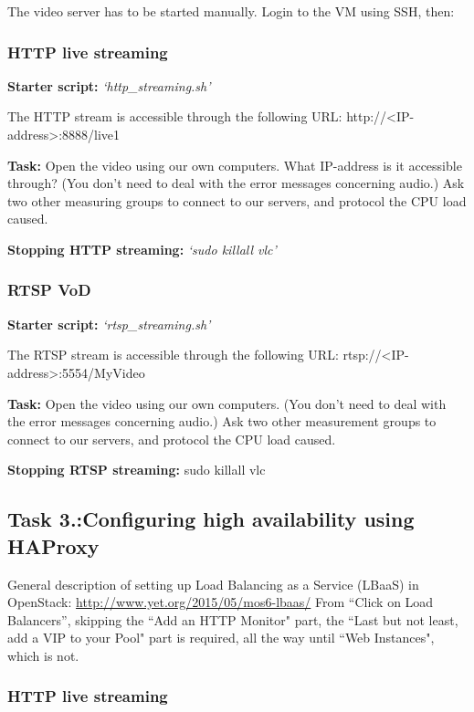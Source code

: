 \documentclass[a4paper]{article}
\begin{document}
The video server has to be started manually. Login to the VM using SSH, then:

\subsubsection{HTTP live streaming}
\textbf{Starter script:} \emph{`http\_streaming.sh'}

\noindent{}The HTTP stream is accessible through the following URL: http://{}\textless{}IP-address{}\textgreater{}:8888/live1 

\noindent{}\textbf{Task:} Open the video using our own computers. What IP-address is it accessible through? (You don't need to deal with the error messages concerning audio.)
Ask two other measuring groups to connect to our servers, and protocol the CPU load caused.

\noindent{}\textbf{Stopping HTTP streaming:} \emph{`sudo killall vlc'}

\subsubsection{RTSP VoD}
\textbf{Starter script:}  \emph{`rtsp\_streaming.sh'}

\noindent{}The RTSP stream is accessible through the following URL: rtsp://{}\textless{}IP-address{}\textgreater{}:5554/MyVideo

\noindent{}\textbf{Task:} Open the video using our own computers. (You don't need to deal with the error messages concerning audio.)
Ask two other measurement groups to connect to our servers, and protocol the CPU load caused.

\noindent{}\textbf{Stopping RTSP streaming:} sudo killall vlc

\subsection{Task 3.:Configuring high availability using HAProxy}

General description of setting up Load Balancing as a Service (LBaaS) in OpenStack:
\url{http://www.yet.org/2015/05/mos6-lbaas/}
From “Click on Load Balancers”, skipping the ``Add an HTTP Monitor" part, the ``Last but not least, add a VIP to your Pool" part is required, all the way until ``Web Instances", which is not.

\subsubsection{HTTP live streaming}
\end{document}
